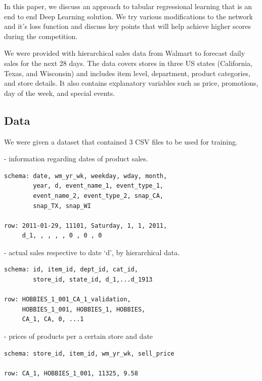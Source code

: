 \documentclass[10pt,twocolumn,letterpaper]{article}
\begin{document}
In this paper, we discuss an approach to tabular regressional learning that is
an end to end Deep Learning solution. We try various modifications to the
network and it's loss function and discuss key points that will help achieve
higher scores during the competition.

We were provided with hierarchical sales data from Walmart to forecast daily
sales for the next 28 days. The data covers stores in three US states
(California, Texas, and Wisconsin) and includes item level, department, product
categories, and store details. It also contains explanatory variables such as
price, promotions, day of the week, and special events.



\subsection{Data}
  We were given a dataset that contained 3 CSV files to be
  used for training.\cite{kaggle}

   - information regarding dates of product sales.
{\small\begin{verbatim}
schema: date, wm_yr_wk, weekday, wday, month,
        year, d, event_name_1, event_type_1,
        event_name_2, event_type_2, snap_CA,
        snap_TX, snap_WI

row: 2011-01-29, 11101, Saturday, 1, 1, 2011,
     d_1, , , , , 0 , 0 , 0
\end{verbatim}}




   - actual sales respective to date ‘d’, by hierarchical data.
  {\small\begin{verbatim}
schema: id, item_id, dept_id, cat_id,
        store_id, state_id, d_1,...d_1913

row: HOBBIES_1_001_CA_1_validation,
     HOBBIES_1_001, HOBBIES_1, HOBBIES,
     CA_1, CA, 0, ...1
  \end{verbatim}}


   - prices of products per a certain store and date

  {\small\begin{verbatim}
schema: store_id, item_id, wm_yr_wk, sell_price

row: CA_1, HOBBIES_1_001, 11325, 9.58
  \end{verbatim}}
\end{document}

